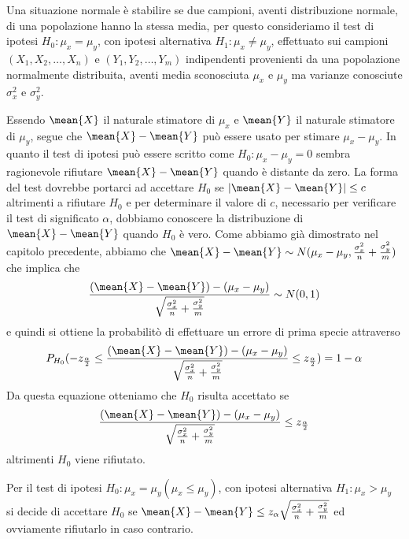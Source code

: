 Una situazione normale è stabilire se due campioni, aventi distribuzione normale, di una popolazione hanno la stessa
media, per questo consideriamo il test di ipotesi $H_0:\mu_x = \mu_y$, con ipotesi alternativa $H_1:\mu_x \neq \mu_y$,
effettuato sui campioni $(X_1, X_2, \dots, X_n)$ e $(Y_1, Y_2, \dots, Y_m)$ indipendenti provenienti da una popolazione
normalmente distribuita, aventi media sconosciuta $\mu_x$ e $\mu_y$ ma varianze conosciute $\sigma^2_x$ e $\sigma^2_y$.

Essendo $\mean{X}$ il naturale stimatore di $\mu_x$ e $\mean{Y}$ il naturale stimatore di $\mu_y$, segue che $\mean{X} - \mean{Y}$
può essere usato per stimare $\mu_x - \mu_y$.\newline
In quanto il test di ipotesi può essere scritto come $H_0:\mu_x - \mu_y = 0$ sembra ragionevole
rifiutare $\mean{X} - \mean{Y}$ quando è distante da zero.\newline
La forma del test dovrebbe portarci ad accettare $H_0$ se $|\mean{X} - \mean{Y}| \leq c$ altrimenti a rifiutare $H_0$
e per determinare il valore di $c$, necessario per verificare il test di significato $\alpha$, dobbiamo conoscere la
distribuzione di $\mean{X} - \mean{Y}$ quando $H_0$ è vero.\newline
Come abbiamo già dimostrato nel capitolo precedente, abbiamo che 
$\mean{X} - \mean{Y} \sim N(\mu_x - \mu_y, \frac{\sigma_x^2}{n} + \frac{\sigma_y^2}{m})$ che implica che 
\[ \frac{(\mean{X} - \mean{Y}) - (\mu_x - \mu_y)}{\sqrt{\frac{\sigma_x^2}{n} + \frac{\sigma_y^2}{m}}} \sim N(0, 1) \]
e quindi si ottiene la probabilitò di effettuare un errore di prima specie attraverso
\[ P_{H_0}(-z_{\frac{\alpha}{2}} \leq \frac{(\mean{X} - \mean{Y}) - (\mu_x - \mu_y)}{\sqrt{\frac{\sigma_x^2}{n} + \frac{\sigma_y^2}{m}}}
                                 \leq z_{\frac{\alpha}{2}}) = 1 - \alpha \]
Da questa equazione otteniamo che $H_0$ risulta accettato se 
\[ \frac{(\mean{X} - \mean{Y}) - (\mu_x - \mu_y)}{\sqrt{\frac{\sigma_x^2}{n} + \frac{\sigma_y^2}{m}}} \leq z_{\frac{\alpha}{2}} \]
altrimenti $H_0$ viene rifiutato.

Per il test di ipotesi $H_0:\mu_x = \mu_y (\mu_x \leq \mu_y)$, con ipotesi alternativa $H_1:\mu_x > \mu_y$ si decide di
accettare $H_0$ se $\mean{X} - \mean{Y} \leq z_{\alpha}\sqrt{\frac{\sigma_x^2}{n} + \frac{\sigma_y^2}{m}}$ ed ovviamente 
rifiutarlo in caso contrario.

